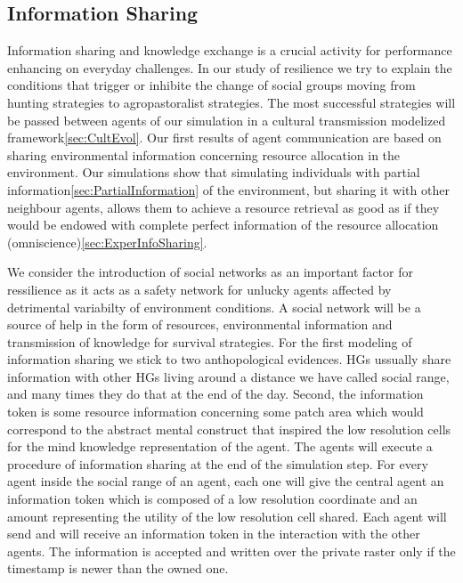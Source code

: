 \documentclass[11pt,oneside,a4paper,openright]{report}
\begin{document}
\subsection{Information Sharing}
\label{sec:InformationSharing}

Information sharing and knowledge exchange is a crucial activity for performance enhancing on everyday challenges. In our study of resilience we try to explain the conditions that trigger or inhibite the change of social groups moving from hunting strategies to agropastoralist strategies. The most successful strategies will be passed between agents of our simulation in a cultural transmission modelized framework\ref{sec:CultEvol}. Our first results of agent communication are based on sharing environmental information concerning resource allocation in the environment. Our simulations show that simulating individuals with partial information\ref{sec:PartialInformation} of the environment, but sharing it with other neighbour agents, allows them to achieve a resource retrieval as good as if they would be endowed with complete perfect information of the resource allocation (omniscience)\ref{sec:ExperInfoSharing}.

We consider the introduction of social networks as an important factor for ressilience as it acts as a safety network for unlucky agents affected by detrimental variabilty of environment conditions.%
A social network will be a source of help in the form of resources, environmental information and transmission of knowledge for survival strategies. For the first modeling of information sharing we stick to two anthopological evidences. HGs ussually share information with other HGs living around a distance we have called social range, and many times they do that at the end of the day. Second, the information token is some resource information concerning some patch area which would correspond to the abstract mental construct that inspired the low resolution cells for the mind knowledge representation of the agent. The agents will execute a procedure of information sharing at the end of the simulation step. For every agent inside the social range of an agent, each one will give the central agent an information token which is composed of a low resolution coordinate and an amount representing the utility of the low resolution cell shared. Each agent will send and will receive an information token in the interaction with the other agents. The information is accepted and written over the private raster only if the timestamp is newer than the owned one.
\end{document}
